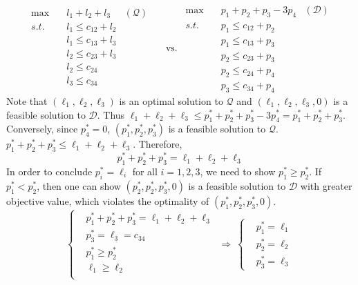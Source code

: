 \begin{enumerate}
\begin{enumerate}[(a)]
	\[
	\begin{aligned}
	\max \quad & l_1 + l_2 + l_3 &(\mathcal{Q})\\
	s.t. \quad & l_1 \le c_{12} + l_2 \\
	&l_1 \le c_{13} + l_3 \\
	&l_2 \le c_{23} + l_3 \\
	& l_2 \le c_{24}\\
	&l_3 \le c_{34}\\
	\end{aligned} ~~~~~\text{ vs.}~~\begin{aligned}
	\max \quad &p_1+p_2+p_3-3p_4 &(\mathcal{D})\\
	s.t.\quad & p_1 \le c_{12} + p_2\\
	&p_1 \le c_{13} + p_3\\
	&p_2 \le c_{23}+p_3\\
	&p_2\le c_{24}+p_4\\
	&p_3\le c_{34}+p_4
	\end{aligned}
	\]
	Note that $(\ell_1, \ell_2, \ell_3)$ is an optimal solution to $\mathcal{Q}$ and $(\ell_1,\ell_2,\ell_3, 0)$ is a feasible solution to $\mathcal{D}$. Thus
	\(
	\ell_1 + \ell_2 + \ell_3 \le p_1^* +p_2^*+p_3^* - 3p_4^* =  p_1^* +p_2^*+p_3^*
	\). 
	Conversely, since $p_4^*=0$, $(p_1^*, p_2^*,p_3^*)$ is a feasible solution to $\mathcal{Q}$.
	\(
	p_1^* +p_2^*+p_3^* \le \ell_1 + \ell_2 + \ell_3
	\).
	Therefore, $$p_1^* +p_2^*+p_3^* = \ell_1 + \ell_2 + \ell_3$$ In order to conclude $p_i^*=\ell_i$ for all $i=1,2,3$, we need to show $p_1^*\ge p_2^*$. If $p_1^*<p_2^*$, then one can show $(p_2^*,p_2^*,p_3^*,0)$ is a feasible solution to $\mathcal{D}$ with greater objective value, which violates the optimality of $(p_1^*,p_2^*,p_3^*,0)$.
	\[
	\left\{ 
	\begin{aligned}
	&p_1^* +p_2^* +p_3^* = \ell_1 + \ell_2 +\ell_3\\
	&p_3^* = \ell_3 = c_{34}\\
	&p_1^* \ge p_2^*\\
	&\ell_1 \ge \ell_2\\
	\end{aligned}\right. ~\Rightarrow~ \left\{ 
	\begin{aligned}
	&p_1^*= \ell_1 \\
	&p_2^* = \ell_2\\
	&p_3^* = \ell_3
	\end{aligned}\right.
	\] 
\end{enumerate}


\end{enumerate}
